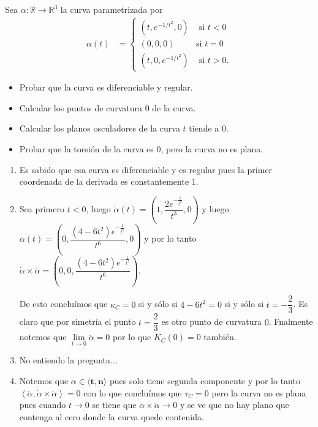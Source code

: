\documentclass[11pt]{article}
\newcommand{\R}{{\mathbb{R}}}
\newcommand\ip[1]{\left\langle#1\right\rangle}
\renewcommand\tt{\mathbf{t}}
\newcommand\nn{\mathbf{n}}
\newenvironment{proof}[1][Demostraci\'on]{\begin{trivlist}
		\item[\hskip \labelsep {\bfseries #1}]}{\end{trivlist}}
\newcommand{\qed}{\nobreak \ifvmode \relax \else
	\ifdim\lastskip<1.5em \hskip-\lastskip
	\hskip1.5em plus0em minus0.5em \fi \nobreak
	\vrule height0.75em width0.5em depth0.25em\fi}
\begin{document}
\begin{enumerate}
	\item Sea $\alpha: \R \to \R^3$ la curva parametrizada por
	\begin{align*}
	\alpha(t) &= 
	\begin{cases}
	(t,e^{-1/t^2},0) & \mbox{ si } t < 0 \\
	(0,0,0) & \mbox{si } t = 0 \\
	(t,0,e^{-1/t^2}) & \mbox{ si } t > 0.
	\end{cases}
	\end{align*}
	\begin{itemize}
		\item Probar que la curva es diferenciable y regular.
		\item Calcular los puntos de curvatura $0$ de la curva.
		\item Calcular los planos osculadores de la curva $t$ tiende a $0$.
		\item Probar que la torsi\'on de la curva es $0$, pero la curva no es plana.
	\end{itemize}
	
	
	\label{Ejercicio 5}
	
	\begin{proof}
		
		\begin{enumerate}
			
			\item Es sabido que esa curva es diferenciable y es regular pues la primer coordenada de la derivada es constantemente 1.
			
			\item Sea primero $t < 0$, luego $\dot{\alpha} (t) =  \left( 1,\dfrac{2e^{-\frac{1}{t^2}}}{t^3}, 0 \right)$ y luego $\ddot{\alpha}(t) = \left( 0, \dfrac{(4 - 6t^2)e^{{-\frac{1}{t^2}}}}{t^6} ,0 \right)$ y por lo tanto $\dot{\alpha} \times \ddot{\alpha} = \left( 0 ,0 , \dfrac{(4 - 6t^2)e^{{-\frac{1}{t^2}}}}{t^6} \right)$.
			
			De esto conclu\'imos que $\kappa_C = 0$ si y s\'olo si $4 - 6t^2 = 0$ si y s\'olo si $t = -\dfrac{2}{3}$. Es claro que por simetr\'ia el punto $t = \dfrac{2}{3}$ es otro punto de curvatura $0$. Fnalmente notemos que $\lim\limits_{t \rightarrow 0}{\ddot{\alpha}} = 0$ por lo que $K_C(0) = 0$ tambi\'en.
			
			\item No entiendo la pregunta...
			
			\item Notemos que $\dddot{\alpha} \in \langle \tt , \nn \rangle$ pues solo tiene segunda componente y por lo tanto $\ip{\dddot{\alpha} , \dot{\alpha} \times \ddot{\alpha}} = 0$ con lo que conclu\'imos que $\tau_C = 0$ pero la curva no es plana pues cuando $t \rightarrow 0$ se tiene que $\dot{\alpha} \times \ddot{\alpha} \rightarrow 0$ y se ve que no hay plano que contenga al cero donde la curva quede contenida. \qed
			

\end{enumerate}
\end{proof}
\end{enumerate}
\end{document}
